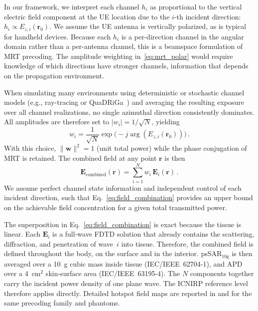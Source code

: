 \documentclass{iopjournal}
\begin{document}
In our framework, we interpret each channel $h_i$ as proportional to the vertical electric field component at the \gls{UE} location due to the $i$-th incident direction: $h_i \propto E_{z,i}(\mathbf{r}_0)$.
We assume the \gls{UE} antenna is vertically polarized, as is typical for handheld devices.
Because each $h_i$ is a per-direction channel in the angular domain rather than a per-antenna channel, this is a beamspace formulation of \gls{MRT} precoding.
The amplitude weighting in~\eqref{eq:mrt_polar} would require knowledge of which directions have stronger channels, information that depends on the propagation environment.

When simulating many environments using deterministic or stochastic channel models (e.g., ray-tracing or QuaDRiGa~\citep{wydaeghe2025outdoor}) and averaging the resulting exposure over all channel realizations, no single azimuthal direction consistently dominates.
All amplitudes are therefore set to $|w_i| = 1/\sqrt{N}$, yielding
\begin{equation}
w_i = \frac{1}{\sqrt{N}} \exp\bigl(-j\arg(E_{z,i}(\mathbf{r}_0))\bigr) \,.
\label{eq:equal_gain_weights}
\end{equation}
With this choice, $\|\mathbf{w}\|^2 = 1$ (unit total power) while the phase conjugation of \gls{MRT} is retained.
The combined field at any point $\mathbf{r}$ is then
\begin{equation}
\mathbf{E}_\mathrm{combined}(\mathbf{r}) = \sum_{i=1}^{N} w_i \, \mathbf{E}_i(\mathbf{r}) \,.
\label{eq:field_combination}
\end{equation}
We assume perfect channel state information and independent control of each incident direction, such that Eq.~\eqref{eq:field_combination} provides an upper bound on the achievable field concentration for a given total transmitted power.

The superposition in Eq.~\eqref{eq:field_combination} is exact because the tissue is linear.
Each $\mathbf{E}_i$ is a full-wave \gls{FDTD} solution that already contains the scattering, diffraction, and penetration of wave~$i$ into tissue.
Therefore, the combined field is defined throughout the body, on the surface and in the interior.
psSAR$_{10\mathrm{g}}$ is then averaged over a 10~g cubic mass inside tissue (IEC/IEEE~62704-1), and \gls{APD} over a 4~cm$^2$ skin-surface area (IEC/IEEE~63195-4).
The $N$ components together carry the incident power density of one plane wave.
The \gls{ICNIRP} reference level therefore applies directly.
Detailed hotspot field maps are reported in \citet{herssens2025autoinduced} and \citet{shikhantsov2020massive} for the same precoding family and phantoms.
\end{document}
